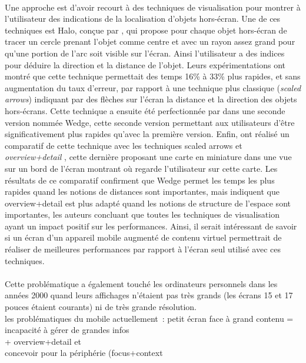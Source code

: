 \paragraph*{}
Une approche est d'avoir recourt à des techniques de visualisation pour montrer à l'utilisateur des indications de la localisation d'objets hors-écran. Une de ces techniques est Halo, conçue par \citet{BaudischRosenholtz2003}, qui propose pour chaque objet hors-écran de tracer un cercle prenant l'objet comme centre et avec un rayon assez grand pour qu'une portion de l'arc soit visible sur l'écran. Ainsi l'utilisateur a des indices pour déduire la direction et la distance de l'objet. Leurs expérimentations ont montré que cette technique permettait des temps 16\% à 33\% plus rapides, et sans augmentation du taux d'erreur, par rapport à une technique plus classique (\emph{scaled arrows}) indiquant par des flèches sur l'écran la distance et la direction des objets hors-écrans. Cette technique a ensuite été perfectionnée par \citet{GustafsonBaudischGutwinEtAl2008} dans une seconde version nommée Wedge, cette seconde version permettant aux utilisateurs d'être significativement plus rapides qu'avec la première version. Enfin, \citet{BurigatChittaro2011} ont réalisé un comparatif de cette technique avec les techniques \foreignlanguage{english}{scaled arrows} et \emph{overview+detail} , cette dernière proposant une carte en miniature dans une vue sur un bord de l'écran montrant où regarde l'utilisateur sur cette carte. Les résultats de ce comparatif confirment que Wedge permet les temps les plus rapides quand les notions de distances sont importantes, mais indiquent que overview+detail est plus adapté quand les notions de structure de l'espace sont importantes, les auteurs concluant que toutes les techniques de visualisation ayant un impact positif sur les performances. Ainsi, il serait intéressant de savoir si un écran d'un appareil mobile augmenté de contenu virtuel permettrait de réaliser de meilleures performances par rapport à l'écran seul utilisé avec ces techniques.


\paragraph*{}
Cette problématique a également touché les ordinateurs personnels dans les années 2000 quand leurs affichages n'étaient pas très grands (les écrans 15 et 17 pouces étaient courants) ni de très grande résolution. \\
les problématiques du mobile actuellement~: petit écran face à grand contenu = incapacité à gérer de grandes infos \\
+ overview+detail \cite{BergeSerranoPerelmanEtAl2014} et \cite{RashidNacentaQuigley2012}\\
concevoir pour la périphérie (focus+context \cite{CockburnKarlsonBederson2009}

